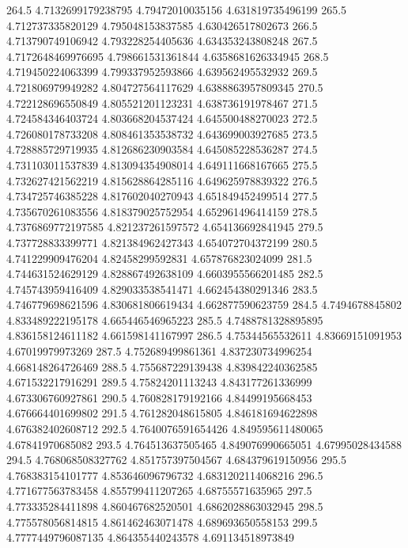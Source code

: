 264.5 4.7132699179238795 4.79472010035156 4.631819735496199
265.5 4.712737335820129 4.795048153837585 4.630426517802673
266.5 4.713790749106942 4.793228254405636 4.634353243808248
267.5 4.7172648469976695 4.798661531361844 4.6358681626334945
268.5 4.719450224063399 4.799337952593866 4.639562495532932
269.5 4.721806979949282 4.804727564117629 4.6388863957809345
270.5 4.722128696550849 4.805521201123231 4.638736191978467
271.5 4.724584346403724 4.803668204537424 4.645500488270023
272.5 4.726080178733208 4.808461353538732 4.643699003927685
273.5 4.728885729719935 4.812686230903584 4.645085228536287
274.5 4.731103011537839 4.813094354908014 4.649111668167665
275.5 4.732627421562219 4.815628864285116 4.649625978839322
276.5 4.734725746385228 4.817602040270943 4.651849452499514
277.5 4.735670261083556 4.818379025752954 4.652961496414159
278.5 4.7376869772197585 4.821237261597572 4.654136692841945
279.5 4.737728833399771 4.821384962427343 4.654072704372199
280.5 4.741229909476204 4.82458299592831 4.657876823024099
281.5 4.744631524629129 4.828867492638109 4.6603955566201485
282.5 4.745743959416409 4.829033538541471 4.662454380291346
283.5 4.746779698621596 4.830681806619434 4.662877590623759
284.5 4.7494678845802 4.833489222195178 4.665446546965223
285.5 4.7488781328895895 4.836158124611182 4.661598141167997
286.5 4.75344565532611 4.83669151091953 4.67019979973269
287.5 4.752689499861361 4.837230734996254 4.668148264726469
288.5 4.755687229139438 4.839842240362585 4.671532217916291
289.5 4.75824201113243 4.843177261336999 4.673306760927861
290.5 4.760828179192166 4.84499195668453 4.676664401699802
291.5 4.761282048615805 4.846181694622898 4.676382402608712
292.5 4.7640076591654426 4.849595611480065 4.67841970685082
293.5 4.764513637505465 4.849076990665051 4.67995028434588
294.5 4.768068508327762 4.851757397504567 4.684379619150956
295.5 4.768383154101777 4.853646096796732 4.6831202114068216
296.5 4.771677563783458 4.855799411207265 4.68755571635965
297.5 4.773335284411898 4.860467682520501 4.6862028863032945
298.5 4.775578056814815 4.861462463071478 4.689693650558153
299.5 4.7777449796087135 4.864355440243578 4.691134518973849